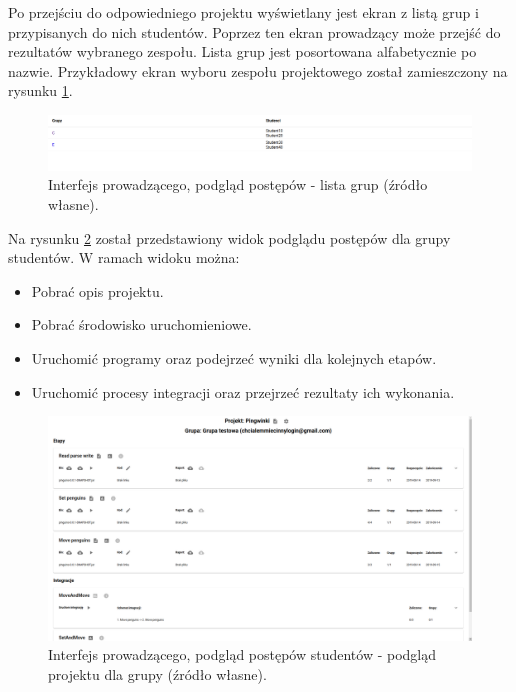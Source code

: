 Po przejściu do odpowiedniego projektu wyświetlany jest ekran z listą grup i przypisanych do nich studentów.
Poprzez ten ekran prowadzący może przejść do rezultatów wybranego zespołu.
Lista grup jest posortowana alfabetycznie po nazwie.
Przykładowy ekran wyboru zespołu projektowego został zamieszczony na rysunku \ref{fig:lecturer_preview_groups}.

\begin{figure}[h]
    \centering
    \includegraphics[width = 13cm]{chapter04/lecturer_preview_groups.png}
    \caption{Interfejs prowadzącego, podgląd postępów - lista grup (źródło własne).}
    \label{fig:lecturer_preview_groups}
\end{figure}

Na rysunku \ref{fig:lecturer-interface-preview} został przedstawiony widok podglądu postępów dla grupy studentów.
W ramach widoku można:
\begin{itemize}
    \item Pobrać opis projektu.
    \item Pobrać środowisko uruchomieniowe.
    \item Uruchomić programy oraz podejrzeć wyniki dla kolejnych etapów.
    \item Uruchomić procesy integracji oraz przejrzeć rezultaty ich wykonania.
\end{itemize}

\begin{figure}[h]
    \centering
    \includegraphics[width = 13cm]{chapter04/lecturer_interface_preview.png}
    \caption{Interfejs prowadzącego, podgląd postępów studentów - podgląd projektu dla grupy (źródło własne).}
    \label{fig:lecturer-interface-preview}
\end{figure}


